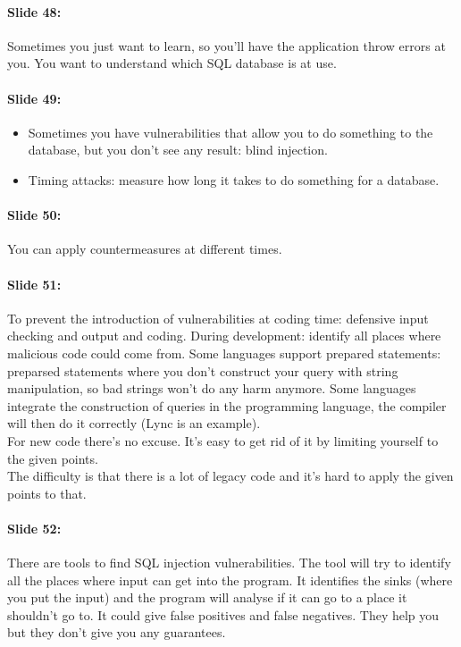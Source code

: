 \documentclass[10pt,a4paper]{report}
\begin{document}
\paragraph{Slide 48:} Sometimes you just want to learn, so you'll have the application throw errors at you. You want to understand which SQL database is at use. 

\paragraph{Slide 49:}
\begin{itemize}
\item Sometimes you have vulnerabilities that allow you to do something to the database, but you don't see any result: blind injection.
\item Timing attacks: measure how long it takes to do something for a database.
\end{itemize}

\paragraph{Slide 50:} You can apply countermeasures at different times.

\paragraph{Slide 51:} To prevent the introduction of vulnerabilities at coding time: defensive input checking and output and coding. During development: identify all places where malicious code could come from. Some languages support prepared statements: preparsed statements where you don't construct your query with string manipulation, so bad strings won't do any harm anymore. Some languages integrate the construction of queries in the programming language, the compiler will then do it correctly (Lync is an example). \\
For new code there's no excuse. It's easy to get rid of it by limiting yourself to the given points.\\
The difficulty is that there is a lot of legacy code and it's hard to apply the given points to that.

\paragraph{Slide 52:} There are tools to find SQL injection vulnerabilities. The tool will try to identify all the places where input can get into the program. It identifies the sinks (where you put the input) and the program will analyse if it can go to a place it shouldn't go to. It could give false positives and false negatives. They help you but they don't give you any guarantees.
\end{document}
